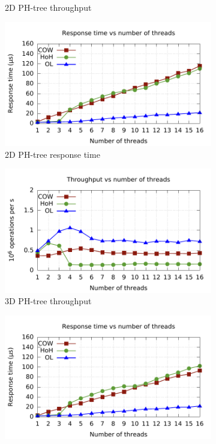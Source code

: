 \documentclass[11pt,a4paper]{globis-book}
\begin{document}
\begin{figure}
\begin{subfigure}[b]{0.5\linewidth}
        \caption{2D PH-tree throughput}
    \end{subfigure}%
    \begin{subfigure}[b]{0.5\linewidth}
        \includegraphics[scale=0.5]{images/plots/insert2d-rt}
        \caption{2D PH-tree response time}
    \end{subfigure}
    \begin{subfigure}[b]{0.5\linewidth}
        \includegraphics[scale=0.5]{images/plots/insert3d-tp}
        \caption{3D PH-tree throughput}
    \end{subfigure}%
    \begin{subfigure}[b]{0.5\linewidth}
        \includegraphics[scale=0.5]{images/plots/insert3d-rt}

\end{subfigure}
\end{figure}
\end{document}
